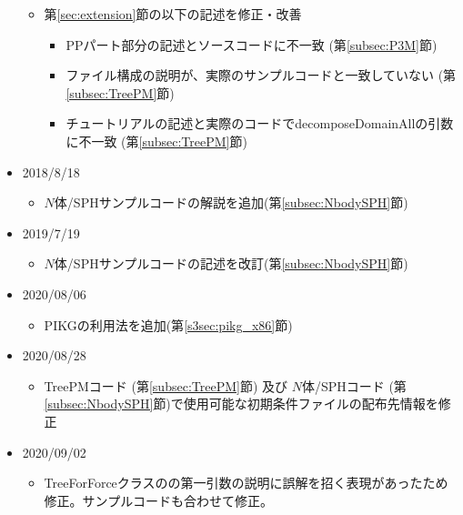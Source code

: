 \begin{itemize}
\begin{itemize}
\begin{itemize}
    \end{itemize}
  \item 第\ref{sec:extension}節の以下の記述を修正・改善
    \begin{itemize}
    \item PPパート部分の記述とソースコードに不一致 (第\ref{subsec:P3M}節)
    \item ファイル構成の説明が、実際のサンプルコードと一致していない (第\ref{subsec:TreePM}節)
    \item チュートリアルの記述と実際のコードでdecomposeDomainAllの引数に不一致 (第\ref{subsec:TreePM}節)
    \end{itemize}
  \end{itemize}
\item 2018/8/18
  \begin{itemize}
  \item $N$体/SPHサンプルコードの解説を追加(第\ref{subsec:NbodySPH}節)
  \end{itemize}
  
\item 2019/7/19
  \begin{itemize}
  \item $N$体/SPHサンプルコードの記述を改訂(第\ref{subsec:NbodySPH}節)
  \end{itemize}

\item 2020/08/06
  \begin{itemize}
  \item PIKGの利用法を追加(第\ref{s3sec:pikg_x86}節)
  \end{itemize}

\item 2020/08/28
  \begin{itemize}
  \item TreePMコード (第\ref{subsec:TreePM}節) 及び $N$体/SPHコード (第\ref{subsec:NbodySPH}節)で使用可能な初期条件ファイルの配布先情報を修正
  \end{itemize}

\item 2020/09/02
  \begin{itemize}
  \item TreeForForceクラスの\initTree の第一引数の説明に誤解を招く表現があったため修正。サンプルコードも合わせて修正。
  \end{itemize}


\end{itemize}

